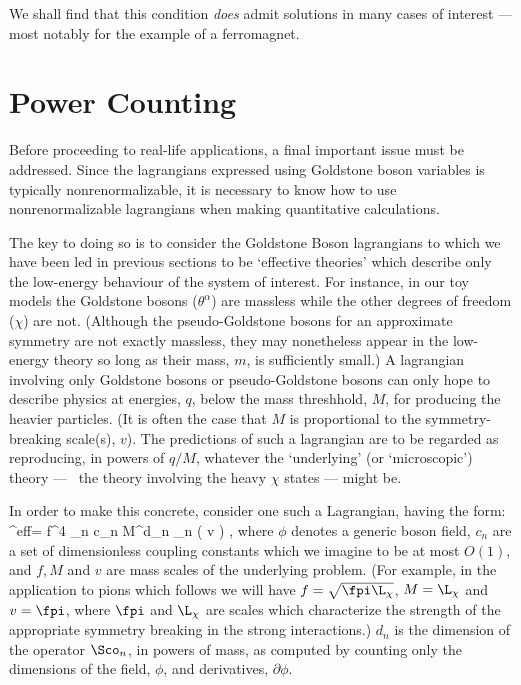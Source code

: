 \documentclass[12pt]{report}
\def\leff{\Scl^{\rm eff}}
\begin{document}
We shall find that this condition {\em does} admit
solutions in many cases of interest --- most notably for
the example of a ferromagnet.

\section{Power Counting}

Before proceeding to real-life applications, a final
important issue must be addressed.  Since the lagrangians
expressed using Goldstone boson variables is typically
nonrenormalizable, it is necessary to know how to use
nonrenormalizable lagrangians  when making quantitative
calculations. 

The key to doing so is to consider the Goldstone Boson
lagrangians to which we have been led in previous sections
to be `effective theories' which describe only the
low-energy behaviour of the system of interest. For
instance, in our toy models the Goldstone bosons
($\theta^\alpha$) are massless while the other degrees of
freedom ($\chi$) are not. (Although the pseudo-Goldstone
bosons for an approximate symmetry are not exactly
massless, they may nonetheless appear in the low-energy
theory so long as their mass, $m$, is  sufficiently small.)
A lagrangian involving only Goldstone bosons or
pseudo-Goldstone bosons can only hope to describe physics
at energies, $q$, below the mass threshhold, $M$, for
producing the heavier particles. (It is often the case that
$M$  is proportional to the symmetry-breaking scale(s),
$v$). The predictions of such a lagrangian are to be
regarded as reproducing, in powers of $q/M$, whatever the
`underlying' (or `microscopic') theory --- \ie\ the theory
involving the heavy $\chi$ states --- might be.

In order to make this concrete, consider one such a
Lagrangian, having the form:
%
\eq
\label{leffpc}
\leff = f^4 \sum_n {c_n \over M^{d_n}} \; 
\Sco_n \left( {\phi \over v}
\right) ,
\eeq
%
where $\phi$ denotes a generic boson field, $c_n$ are a set
of dimensionless coupling constants which we imagine to be
at most $O(1)$, and $f, M$ and $v$ are mass scales of the
underlying problem. (For example, in the application to
pions which follows we will have $f = \sqrt{\fpi \L_\chi}$,
$M = \L_\chi$ and $v = 
\fpi$, where $\fpi$ and $\L_\chi$ are scales which
characterize the strength of the appropriate symmetry
breaking in the strong interactions.) $d_n$ is the
dimension of the operator $\Sco_n$, in powers of mass, as
computed by counting only the dimensions of the  field,
$\phi$, and derivatives, $\partial\phi$.
\end{document}
